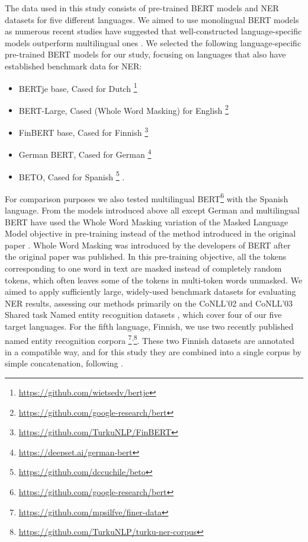 The data used in this study consists of pre-trained BERT models and NER datasets for five different languages. We aimed to use monolingual BERT models as numerous recent studies have suggested that well-constructed language-specific models outperform multilingual ones \cite{virtanen2019multilingual,vries_bertje_2019,le2020flaubert}.
We selected the following language-specific pre-trained BERT models for our study, focusing on languages that also have established benchmark data for NER:
\begin{itemize}
\item BERTje base, Cased for Dutch \cite{vries_bertje_2019}\footnote{\url{https://github.com/wietsedv/bertje}}
\item BERT-Large, Cased (Whole Word Masking) for English \footnote{\url{https://github.com/google-research/bert}}
\item FinBERT base, Cased for Finnish \cite{virtanen2019multilingual}\footnote{\url{https://github.com/TurkuNLP/FinBERT}}
\item German BERT, Cased for German \footnote{\url{https://deepset.ai/german-bert}}
\item BETO, Cased for Spanish \cite{CaneteCFP2020}\footnote{\url{https://github.com/dccuchile/beto}} .
\end{itemize}
For comparison purposes we also tested multilingual BERT\footnote{\url{https://github.com/google-research/bert}} with the Spanish language. From the models introduced above all except German and multilingual BERT have used the Whole Word Masking variation of the Masked Language Model objective in pre-training instead of the method introduced in the original paper \cite{devlin2018bert}. Whole Word Masking was introduced by the developers of BERT after the original paper was published. In this pre-training objective, all the tokens corresponding to one word in text are masked instead of completely random tokens, which often leaves some of the tokens in multi-token words unmasked.       
We aimed to apply sufficiently large, widely-used benchmark datasets for evaluating NER results, assessing our methods primarily on the CoNLL'02 and CoNLL'03 Shared task Named entity recognition datasets \cite{Tjong_Kim_Sang_2002,Tjong_Kim_Sang_2003}, which cover four of our five target languages. For the fifth language, Finnish, we use two recently published named entity recognition corpora \cite{ruokolainen2019finnish,luoma-EtAl:2020:LREC}\footnote{\url{https://github.com/mpsilfve/finer-data}}\textsuperscript{,}\footnote{ \url{https://github.com/TurkuNLP/turku-ner-corpus}}. These two Finnish datasets are annotated in a compatible way, and for this study they are combined into a single corpus by simple concatenation, following .

